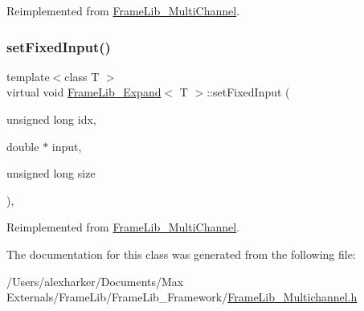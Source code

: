Reimplemented from \hyperlink{class_frame_lib___multi_channel_af27f3dca507c48459452be825b4c0c72}{Frame\+Lib\+\_\+\+Multi\+Channel}.

\mbox{\label{class_frame_lib___expand_a73f7bf4264d45f56f249d6303b3e4c35}} 
\subsubsection{\texorpdfstring{set\+Fixed\+Input()}{setFixedInput()}}
{\footnotesize\ttfamily template$<$class T $>$ \\
virtual void \hyperlink{class_frame_lib___expand}{Frame\+Lib\+\_\+\+Expand}$<$ T $>$\+::set\+Fixed\+Input (\begin{DoxyParamCaption}\item[{unsigned long}]{idx,  }\item[{double $\ast$}]{input,  }\item[{unsigned long}]{size }\end{DoxyParamCaption})\hspace{0.3cm}{\ttfamily [inline]}, {\ttfamily [virtual]}}



Reimplemented from \hyperlink{class_frame_lib___multi_channel_a2bbd1050ff53556bf671282312857301}{Frame\+Lib\+\_\+\+Multi\+Channel}.



The documentation for this class was generated from the following file\+:\begin{DoxyCompactItemize}
\item 
/\+Users/alexharker/\+Documents/\+Max Externals/\+Frame\+Lib/\+Frame\+Lib\+\_\+\+Framework/\hyperlink{_frame_lib___multichannel_8h}{Frame\+Lib\+\_\+\+Multichannel.\+h}\end{DoxyCompactItemize}
